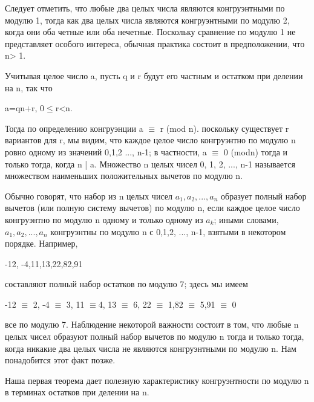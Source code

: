 \documentclass[11pt]{article}
\begin{document}
	Следует отметить, что любые два целых числа являются конгруэнтными по модулю 1, тогда как два целых числа являются конгруэнтными по модулю 2, когда они оба четные или оба нечетные. Поскольку сравнение по модулю 1 не представляет особого интереса, обычная практика состоит в предположении, что n> 1.
	
	Учитывая целое число a, пусть q и r будут его частным и остатком при делении на n, так что
	
	\begin{center}
		a=qn+r,  0$\leq$r<n.
	\end{center}
	
	Тогда по определению конгруэнции a $\equiv$ r (mod n). поскольку существует r вариантов для r, мы видим, что каждое целое число конгруэнтно по модулю n ровно одному из значений 0,1,2 ..., n-1; в частности, a $\equiv$ 0 (modn) тогда и только тогда, когда n | a. Множество n целых чисел 0, 1, 2, ..., n-1 называется множеством наименьших положительных вычетов по модулю n.
	
	Обычно говорят, что набор из n целых чисел $a_{1}, a_{2}, ..., a_{n}$ образует полный набор вычетов (или полную систему вычетов) по модулю n, если каждое целое число конгруэнтно по модулю n одному и только одному из $a_{k}$; иными словами, $a_{1}, a_{2}, ..., a_{n}$ конгруэнтны по модулю n с 0,1,2, ..., n-1, взятыми в некотором порядке. Например,
	\begin{center}
		-12, -4,11,13,22,82,91
	\end{center}
	
	составляют полный набор остатков по модулю 7; здесь мы имеем
	\begin{center}
		-12 $\equiv$ 2, -4 $\equiv$ 3, 11 $\equiv$4, 13 $\equiv$ 6, 22 $\equiv$ 1,82 $\equiv$ 5,91 $\equiv$ 0
	\end{center}
	все по модулю 7. Наблюдение некоторой важности состоит в том, что любые n целых чисел образуют полный набор вычетов по модулю n тогда и только тогда, когда никакие два целых числа не являются конгруэнтными по модулю n. Нам понадобится этот факт позже.
	
	Наша первая теорема дает полезную характеристику конгруэнтности по модулю n в терминах остатков при делении на n.
	
\end{document}

